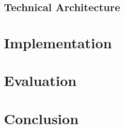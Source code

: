 \documentclass[10pt,a4paper]{report}
\begin{document}
\section{Technical Architecture}


\chapter{Implementation}
\label{chp:implementation}

\chapter{Evaluation}
\label{chp:evaluation}

\chapter{Conclusion}



\end{document}
